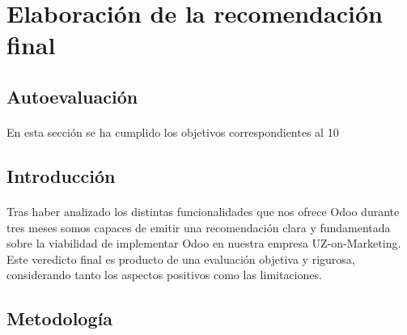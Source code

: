 \section{Elaboración de la recomendación final}
\subsection{Autoevaluación}
\paragraph{}
En esta sección se ha cumplido los objetivos correspondientes al 10
\subsection{Introducción}
\paragraph{}
Tras haber analizado los distintas funcionalidades que nos ofrece Odoo durante tres meses somos capaces de emitir una recomendación clara y fundamentada sobre la viabilidad de implementar Odoo en nuestra empresa UZ-on-Marketing. Este veredicto final es producto de una evaluación objetiva y rigurosa, considerando tanto los aspectos positivos como las limitaciones.
\subsection{Metodología}
